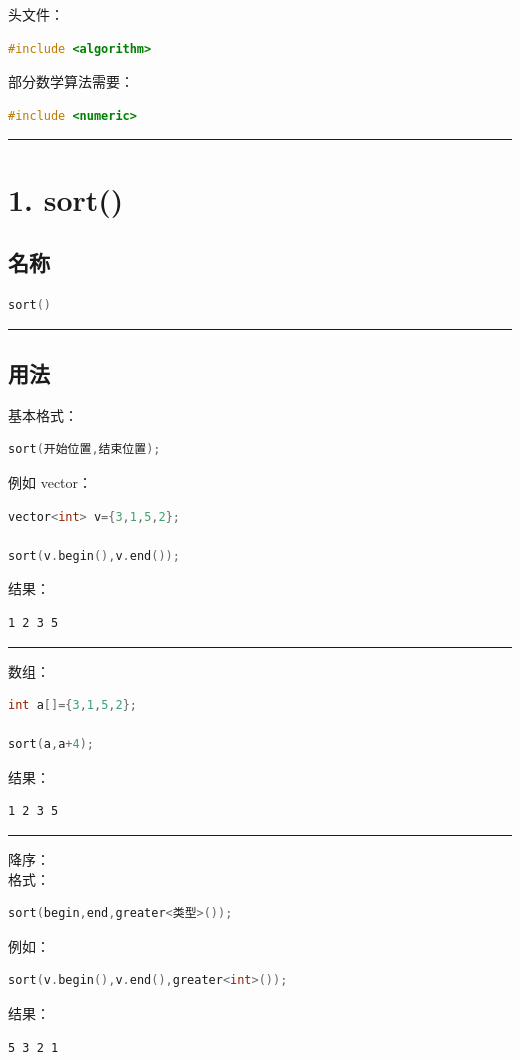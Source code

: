 \documentclass[9pt,twocolumn]{extarticle}
\begin{document}
头文件：
\begin{lstlisting}[language=C++]
#include <algorithm>
\end{lstlisting}
部分数学算法需要：
\begin{lstlisting}[language=C++]
#include <numeric>
\end{lstlisting}

\noindent\rule{\linewidth}{0.4pt}

\section{1. sort()}

\subsection{名称}
\begin{lstlisting}[language=C++]
sort()
\end{lstlisting}

\noindent\rule{\linewidth}{0.4pt}

\subsection{用法}
基本格式：
\begin{lstlisting}[language=C++]
sort(开始位置,结束位置);
\end{lstlisting}
例如 vector：
\begin{lstlisting}[language=C++]
vector<int> v={3,1,5,2};

sort(v.begin(),v.end());
\end{lstlisting}
结果：
\begin{lstlisting}
1 2 3 5
\end{lstlisting}

\noindent\rule{\linewidth}{0.4pt}

数组：
\begin{lstlisting}[language=C++]
int a[]={3,1,5,2};

sort(a,a+4);
\end{lstlisting}
结果：
\begin{lstlisting}
1 2 3 5
\end{lstlisting}

\noindent\rule{\linewidth}{0.4pt}

降序：\\
格式：
\begin{lstlisting}[language=C++]
sort(begin,end,greater<类型>());
\end{lstlisting}
例如：
\begin{lstlisting}[language=C++]
sort(v.begin(),v.end(),greater<int>());
\end{lstlisting}
结果：
\begin{lstlisting}
5 3 2 1
\end{lstlisting}
\end{document}
